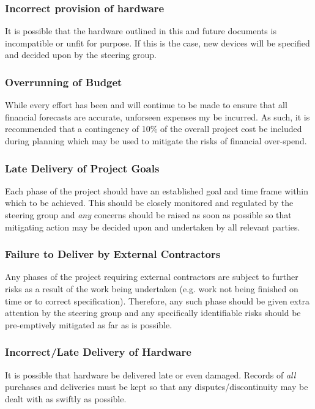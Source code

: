 \documentclass[a4paper, twoside]{article}
\begin{document}
\subsubsection{Incorrect provision of hardware}
It is possible that the hardware outlined in this and future documents is
incompatible or unfit for purpose. If this is the case, new devices will be
specified and decided upon by the steering group.

\subsubsection{Overrunning of Budget}
While every effort has been and will continue to be made to ensure that all
financial forecasts are accurate, unforseen expenses my be incurred. As such, it
is recommended that a contingency of 10\% of the overall project cost be
included during planning which may be used to mitigate the risks of financial
over-spend.

\subsubsection{Late Delivery of Project Goals}
Each phase of the project should have an established goal and time frame within
which to be achieved. This should be closely monitored and regulated by the
steering group and \emph{any} concerns should be raised as soon as possible so
that mitigating action may be decided upon and undertaken by all relevant
parties.

\subsubsection{Failure to Deliver by External Contractors}
Any phases of the project requiring external contractors are subject to further
risks as a result of the work being undertaken (e.g. work not being finished on
time or to correct specification). Therefore, any such phase should be given
extra attention by the steering group and any specifically identifiable risks
should be pre-emptively mitigated as far as is possible.

\subsubsection{Incorrect/Late Delivery of Hardware}
It is possible that hardware be delivered late or even damaged. Records of
\emph{all} purchases and deliveries must be kept so that any
disputes/discontinuity may be dealt with as swiftly as possible.
\end{document}
